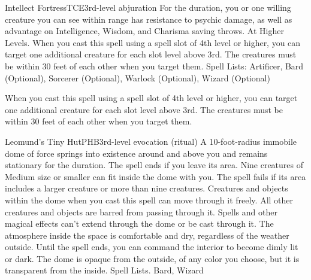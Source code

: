\begin{spell}{Intellect Fortress}{TCE}{3rd-level abjuration}
{
}
For the duration, you or one willing creature you can see within range has resistance to psychic damage, as well as advantage on Intelligence, Wisdom, and Charisma saving throws.
At Higher Levels. When you cast this spell using a spell slot of 4th level or higher, you can target one additional creature for each slot level above 3rd. The creatures must be within 30 feet of each other when you target them.
Spell Lists: Artificer, Bard (Optional), Sorcerer (Optional), Warlock (Optional), Wizard (Optional)

 When you cast this spell using a spell slot of 4th level or higher, you can target one additional creature for each slot level above 3rd. The creatures must be within 30 feet of each other when you target them.
\end{spell}

\begin{spell}{Leomund's Tiny Hut}{PHB}{3rd-level evocation (ritual)}
{
}
A 10-foot-radius immobile dome of force springs into existence around and above you and remains stationary for the duration. The spell ends if you leave its area.
Nine creatures of Medium size or smaller can fit inside the dome with you. The spell fails if its area includes a larger creature or more than nine creatures. Creatures and objects within the dome when you cast this spell can move through it freely. All other creatures and objects are barred from passing through it. Spells and other magical effects can't extend through the dome or be cast through it. The atmosphere inside the space is comfortable and dry, regardless of the weather outside.
Until the spell ends, you can command the interior to become dimly lit or dark. The dome is opaque from the outside, of any color you choose, but it is transparent from the inside.
Spell Lists. Bard, Wizard
\end{spell}

